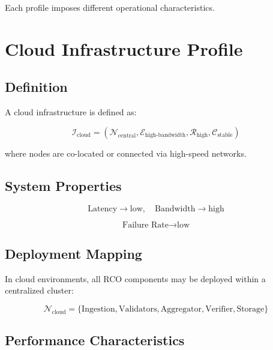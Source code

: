 Each profile imposes different operational characteristics.

\section{Cloud Infrastructure Profile}

\subsection{Definition}

A cloud infrastructure is defined as:

\begin{equation}
\mathcal{I}_{\text{cloud}} = (\mathcal{N}_{\text{central}}, \mathcal{E}_{\text{high-bandwidth}}, \mathcal{R}_{\text{high}}, \mathcal{C}_{\text{stable}})
\end{equation}

where nodes are co-located or connected via high-speed networks.

\subsection{System Properties}

\begin{equation}
\text{Latency} \rightarrow \text{low}, \quad \text{Bandwidth} \rightarrow \text{high}
\end{equation}

\begin{equation}
\text{Failure Rate} \rightarrow \text{low}
\end{equation}

\subsection{Deployment Mapping}

In cloud environments, all RCO components may be deployed within a centralized cluster:

\begin{equation}
\mathcal{N}_{\text{cloud}} = \{\text{Ingestion}, \text{Validators}, \text{Aggregator}, \text{Verifier}, \text{Storage}\}
\end{equation}

\subsection{Performance Characteristics}

